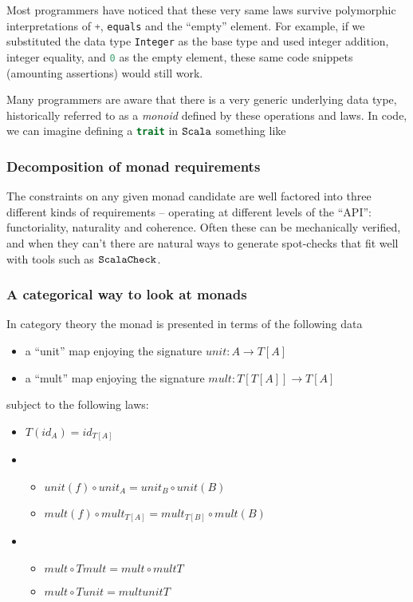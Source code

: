 Most programmers have noticed that these very same laws survive
polymorphic interpretations of \lstinline[language=Scala]!+!, \lstinline[language=Scala]!equals! and the
``empty'' element. For example, if we substituted the data type
\lstinline[language=Scala]!Integer! as the base type and used integer addition, integer
equality, and \lstinline[language=Scala]!0! as the empty element, these same code
snippets (amounting assertions) would still work.

Many programmers are aware that there is a very generic underlying
data type, historically referred to as a \emph{monoid} defined by
these operations and laws. In code, we can imagine defining a
\lstinline[language=Scala]!trait! in $\texttt{Scala}$ something like



\subsubsection{Decomposition of monad requirements}

The constraints on any given monad candidate are well factored into
three different kinds of requirements -- operating at different levels
of the ``API'': functoriality, naturality and coherence. Often these
can be mechanically verified, and when they can't there are natural
ways to generate spot-checks that fit well with tools such as
$\texttt{ScalaCheck}$.

\subsubsection{A categorical way to look at monads}

In category theory the monad is presented in terms of the
following data

\begin{itemize}
  \item a ``unit'' map enjoying the signature $unit : A \to T[A]$
  \item a ``mult'' map enjoying the signature $mult : T[T[A]] \to T[A]$
\end{itemize}

subject to the following laws:

\begin{itemize}
  \item $T( id_A ) = id_{T[A]}$ %
  \item %
    \begin{itemize}
    \item $unit(f) \circ unit_{A} = unit_{B} \circ unit(B)$ %
    \item $mult(f) \circ mult_{T[A]} = mult_{T[B]} \circ mult(B)$ %
    \end{itemize}
  \item %
    \begin{itemize}
    \item $mult \circ T mult = mult \circ mult T$ %
    \item $mult \circ T unit = mult unit T$ %
    \end{itemize}
\end{itemize}

